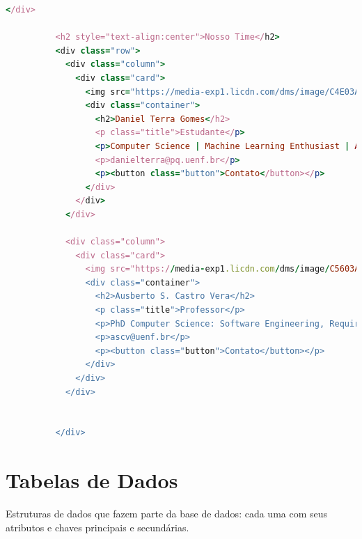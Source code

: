 \begin{itemize}
\begin{lstlisting}[language=Ruby, caption=Tela inicial do sistema (home)]
          </div>

          <h2 style="text-align:center">Nosso Time</h2>
          <div class="row">
            <div class="column">
              <div class="card">
                <img src="https://media-exp1.licdn.com/dms/image/C4E03AQFXwSHsXB5A-w/profile-displayphoto-shrink_200_200/0/1653855378664?e=1671062400&v=beta&t=JnZi5-8DhyHSwJWl68lXvud1KkoxXQDeGJyuVxGWdRY" alt="Daniel" style="width:5%">
                <div class="container">
                  <h2>Daniel Terra Gomes</h2>
                  <p class="title">Estudante</p>
                  <p>Computer Science | Machine Learning Enthusiast | AI Ethics</p>
                  <p>danielterra@pq.uenf.br</p>
                  <p><button class="button">Contato</button></p>
                </div>
              </div>
            </div>

            <div class="column">
              <div class="card">
                <img src="https://media-exp1.licdn.com/dms/image/C5603AQHKXoHRT58ayQ/profile-displayphoto-shrink_200_200/0/1516814846280?e=1671062400&v=beta&t=cic_dbtWwgtjWRRnokSRsCxRugh6w52FOZYAksyRxEs" alt="Ausberto" style="width:5%">
                <div class="container">
                  <h2>Ausberto S. Castro Vera</h2>
                  <p class="title">Professor</p>
                  <p>PhD Computer Science: Software Engineering, Requirements Engineering, Computer Security, Cloud Computing</p>
                  <p>ascv@uenf.br</p>
                  <p><button class="button">Contato</button></p>
                </div>
              </div>
            </div>


          </div>

          \end{lstlisting}
\end{itemize}


\section{Tabelas de Dados}
Estruturas de dados que fazem parte da base de dados: cada uma com seus atributos e chaves principais e secund\'{a}rias.
